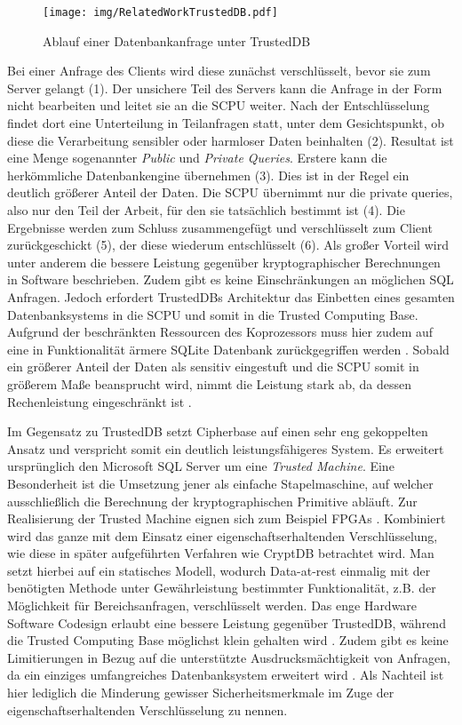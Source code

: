 \begin{figure}[h]
	\texttt{[image: img/RelatedWorkTrustedDB.pdf]}
	\centering
	\caption{Ablauf einer Datenbankanfrage unter TrustedDB}
	\label{fig:trusteddb}
\end{figure}

Bei einer Anfrage des Clients wird diese zunächst verschlüsselt, bevor sie zum Server gelangt (1). Der unsichere Teil des Servers kann die Anfrage in der Form nicht bearbeiten und leitet sie an die SCPU weiter. Nach der Entschlüsselung findet dort eine Unterteilung in Teilanfragen statt, unter dem Gesichtspunkt, ob diese die Verarbeitung sensibler oder harmloser Daten beinhalten (2). Resultat ist eine Menge sogenannter \textit{Public} und \textit{Private Queries}. Erstere kann die herkömmliche Datenbankengine übernehmen (3). Dies ist in der Regel ein deutlich größerer Anteil der Daten. Die SCPU übernimmt nur die private queries, also nur den Teil der Arbeit, für den sie tatsächlich bestimmt ist (4). Die Ergebnisse werden zum Schluss zusammengefügt und verschlüsselt zum Client zurückgeschickt (5), der diese wiederum entschlüsselt (6). Als großer Vorteil wird unter anderem die bessere Leistung gegenüber kryptographischer Berechnungen in Software beschrieben. Zudem gibt es keine Einschränkungen an möglichen \ac{SQL} Anfragen. Jedoch erfordert TrustedDBs Architektur das Einbetten eines gesamten Datenbanksystems in die SCPU und somit in die Trusted Computing Base. Aufgrund der beschränkten Ressourcen des Koprozessors muss hier zudem auf eine in Funktionalität ärmere SQLite Datenbank zurückgegriffen werden \cite{Arasu}. Sobald ein größerer Anteil der Daten als sensitiv eingestuft und die SCPU somit in größerem Maße beansprucht wird, nimmt die Leistung stark ab, da dessen Rechenleistung eingeschränkt ist \cite{Arasu2012}.

Im Gegensatz zu TrustedDB setzt Cipherbase \cite{Arasu2012}\cite{Arasu} auf einen sehr eng gekoppelten Ansatz und verspricht somit ein deutlich leistungsfähigeres System. Es erweitert ursprünglich den Microsoft \ac{SQL} Server um eine \textit{Trusted Machine}. Eine Besonderheit ist die Umsetzung jener als einfache Stapelmaschine, auf welcher ausschließlich die Berechnung der kryptographischen Primitive abläuft. Zur Realisierung der Trusted Machine eignen sich zum Beispiel \acp{FPGA} \cite{Arasu}. Kombiniert wird das ganze mit dem Einsatz einer eigenschaftserhaltenden Verschlüsselung, wie diese in später aufgeführten Verfahren wie CryptDB betrachtet wird. Man setzt hierbei auf ein statisches Modell, wodurch Data-at-rest einmalig mit der benötigten Methode unter Gewährleistung bestimmter Funktionalität, z.B. der Möglichkeit für Bereichsanfragen, verschlüsselt werden. Das enge Hardware Software Codesign erlaubt eine bessere Leistung gegenüber TrustedDB, während die Trusted Computing Base möglichst klein gehalten wird \cite{Arasu}. Zudem gibt es keine Limitierungen in Bezug auf die unterstützte Ausdrucksmächtigkeit von Anfragen, da ein einziges umfangreiches Datenbanksystem erweitert wird \cite{Arasu2013}. Als Nachteil ist hier lediglich die Minderung gewisser Sicherheitsmerkmale im Zuge der eigenschaftserhaltenden Verschlüsselung zu nennen.

